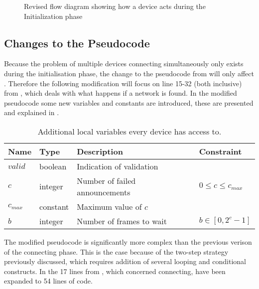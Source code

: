 \begin{figure}[ht]
    \centering \footnotesize
    
    \caption{Revised flow diagram showing how a device acts during the Initialization phase}
    \label{fig:pseudo_flowMultiConnect}
\end{figure}


\subsection{Changes to the Pseudocode} %
\label{sub:changes_to_the_pseudocode}
Because the problem of multiple devices connecting simultaneously only exists during the initialisation phase, the change to the pseudocode from  will only affect .
Therefore the following modification will focus on line 15-32 (both inclusive) from , which deals with what happens if a network is found.
In the modified pseudocode some new variables and constants are introduced, these are presented and explained in .

\begin{table}[ht]
    {\setlength{\extrarowheight}{1ex}%
    \begin{tabularx}{\textwidth}{l|l|X|l}
        \toprule
        Name                & Type      & Description & Constraint \\
        \midrule
        $valid$             & boolean   & Indication of validation              \\
        $c$                 & integer   & Number of failed announcements        & $0 \leq c \leq c_{max}$ \\
        $c_{max}$           & constant   & Maximum value of $c$                        \\
        $b$                 & integer   & Number of frames to wait              & $b \in [0, 2^c-1]$ \\
        \bottomrule
    \end{tabularx}}
    \caption{Additional local variables every device has access to.}
    \label{tab:locals_wmulticonnect}
\end{table}

The modified pseudocode is significantly more complex than the previous verison of the connecting phase.
This is the case because of the two-step strategy previously discussed, which requires addition of several looping and conditional constructs.
In  the 17 lines from , which concerned connecting, have been expanded to 54 lines of code. 

